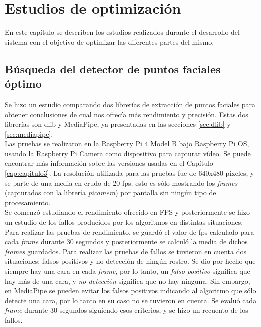 \chapter{Estudios de optimización}
\label{cap:capitulo5}

En este capítulo se describen los estudios realizados durante el desarrollo del sistema con el objetivo de optimizar las diferentes partes del mismo.

\section{Búsqueda del detector de puntos faciales óptimo}
\label{sec:estudio_puntos_faciales}

Se hizo un estudio comparando dos librerías de extracción de puntos faciales para obtener conclusiones de cual nos ofrecía más rendimiento y precisión. Estas dos librerías son dlib y MediaPipe, ya presentadas en las secciones \ref{sec:dlib} y \ref{sec:mediapipe}.\\

Las pruebas se realizaron en la Raspberry Pi 4 Model B bajo Raspberry Pi OS, usando la Raspberry Pi Camera como dispositivo para capturar vídeo. Se puede encontrar más información sobre las versiones usadas en el Capítulo \ref{cap:capitulo3}. La resolución utilizada para las pruebas fue de 640x480 píxeles, y se parte de una media en crudo de 20 fps; esto es sólo mostrando los \textit{frames} (capturados con la librería \textit{picamera}) por pantalla sin ningún tipo de procesamiento.\\

Se comenzó estudiando el rendimiento ofrecido en FPS y posteriormente se hizo un estudio de los fallos producidos por los algoritmos en distintas situaciones. Para realizar las pruebas de rendimiento, se guardó el valor de fps calculado para cada \textit{frame} durante 30 segundos y posteriormente se calculó la media de dichos \textit{frames} guardados. Para realizar las pruebas de fallos se tuvieron en cuenta dos situaciones: falsos positivos y no detección de ningún rostro. Se dio por hecho que siempre hay una cara en cada \textit{frame}, por lo tanto, un \textit{falso positivo} significa que hay más de una cara, y \textit{no detección} significa que no hay ninguna. Sin embargo, en MediaPipe se pueden evitar los falsos positivos indicando al algoritmo que sólo detecte una cara, por lo tanto en su caso no se tuvieron en cuenta. Se evaluó cada \textit{frame} durante 30 segundos siguiendo esos criterios, y se hizo un recuento de los fallos.

